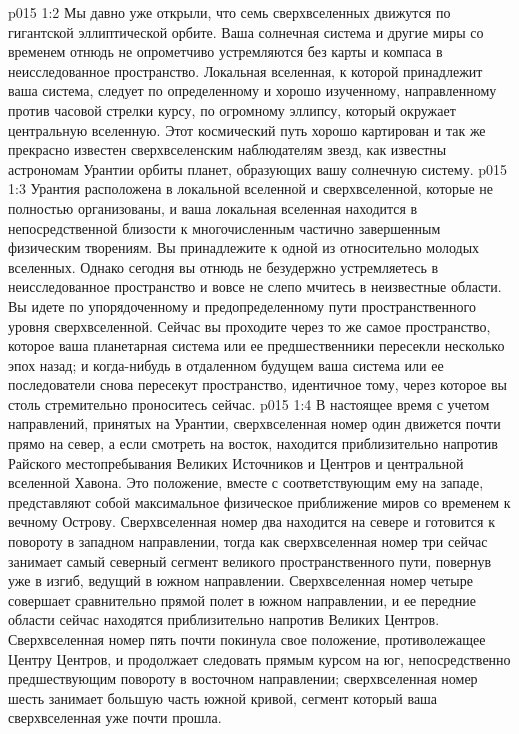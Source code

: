 \vs p015 1:2 Мы давно уже открыли, что семь сверхвселенных движутся по гигантской эллиптической орбите. Ваша солнечная система и другие миры со временем отнюдь не опрометчиво устремляются без карты и компаса в неисследованное пространство. Локальная вселенная, к которой принадлежит ваша система, следует по определенному и хорошо изученному, направленному против часовой стрелки курсу, по огромному эллипсу, который окружает центральную вселенную. Этот космический путь хорошо картирован и так же прекрасно известен сверхвселенским наблюдателям звезд, как известны астрономам Урантии орбиты планет, образующих вашу солнечную систему.
\vs p015 1:3 Урантия расположена в локальной вселенной и сверхвселенной, которые не полностью организованы, и ваша локальная вселенная находится в непосредственной близости к многочисленным частично завершенным физическим творениям. Вы принадлежите к одной из относительно молодых вселенных. Однако сегодня вы отнюдь не безудержно устремляетесь в неисследованное пространство и вовсе не слепо мчитесь в неизвестные области. Вы идете по упорядоченному и предопределенному пути пространственного уровня сверхвселенной. Сейчас вы проходите через то же самое пространство, которое ваша планетарная система или ее предшественники пересекли несколько эпох назад; и когда\hyp{}нибудь в отдаленном будущем ваша система или ее последователи снова пересекут пространство, идентичное тому, через которое вы столь стремительно проноситесь сейчас.
\vs p015 1:4 \pc В настоящее время с учетом направлений, принятых на Урантии, сверхвселенная номер один движется почти прямо на север, а если смотреть на восток, находится приблизительно напротив Райского местопребывания Великих Источников и Центров и центральной вселенной Хавона. Это положение, вместе с соответствующим ему на западе, представляют собой максимальное физическое приближение миров со временем к вечному Острову. Сверхвселенная номер два находится на севере и готовится к повороту в западном направлении, тогда как сверхвселенная номер три сейчас занимает самый северный сегмент великого пространственного пути, повернув уже в изгиб, ведущий в южном направлении. Сверхвселенная номер четыре совершает сравнительно прямой полет в южном направлении, и ее передние области сейчас находятся приблизительно напротив Великих Центров. Сверхвселенная номер пять почти покинула свое положение, противолежащее Центру Центров, и продолжает следовать прямым курсом на юг, непосредственно предшествующим повороту в восточном направлении; сверхвселенная номер шесть занимает большую часть южной кривой, сегмент который ваша сверхвселенная уже почти прошла.
